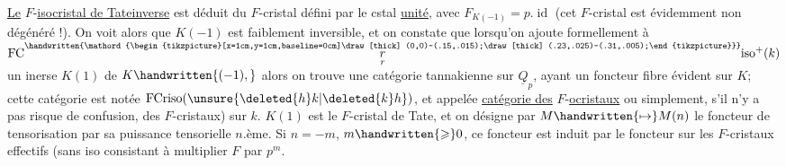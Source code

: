 \uline{Le} $F$-\uline{isocristal de Tateinverse} est déduit du $F$-cristal défini par le cstal \uline{unité}, avec $F_{K(-1)}=p.\operatorname{id}$ (cet $F$-cristal est évidemment non dégénéré !). On voit alors que $K(-1)$ est faiblement inversible, et on constate que lorsqu'on ajoute formellement à $\mathrm{FC}\overset{\handwritten{\mathord{\begin{tikzpicture}[x=1cm,y=1cm,baseline=0cm]\draw[thick] (0,0)--(.15,.015);\draw[thick] (.23,.025)--(.31,.005);\end{tikzpicture}}}}{\underset{r}{r}}\mathrm{iso}^{+}(k)$  un inerse $K(1)$ de $K\handwritten{(-1),}$ alors on trouve une catégorie tannakienne sur $\underline{Q}_p$, ayant un foncteur fibre évident sur $K$; cette catégorie est notée $\operatorname{FCriso}(\unsure{\deleted{h}k|\deleted{k}h})$, et appelée \uline{catégorie des} $F$-\uline{ocristaux} \handwritten{(}ou simplement, s'il n'y  a pas risque de confusion, des $F$-cristaux) sur $k$. $K(1)$ est le $F$-cristal de Tate, et on désigne par $M\handwritten{\mapsto}M(n)$ le foncteur de tensorisation par sa puissance tensorielle $n$.ème. Si $n=-m$, $m\handwritten{\geqslant}0$, ce foncteur est induit par le foncteur sur les $F$-cristaux effectifs (sans iso\unsure{)} consistant à multiplier $F$ par $p^m$.

